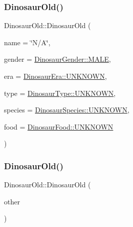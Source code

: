 \subsubsection{\texorpdfstring{Dinosaur\+Old()}{DinosaurOld()}\hspace{0.1cm}{\footnotesize\ttfamily [1/2]}}
{\footnotesize\ttfamily Dinosaur\+Old\+::\+Dinosaur\+Old (\begin{DoxyParamCaption}\item[{const char $\ast$}]{name = {\ttfamily \char`\"{}N/A\char`\"{}},  }\item[{const \hyperlink{DinosaurOld_8hpp_a98f70ab69c44631b0efc003a2c9b3d30}{Dinosaur\+Gender}}]{gender = {\ttfamily \hyperlink{DinosaurOld_8hpp_a98f70ab69c44631b0efc003a2c9b3d30a797e877326f44c5763d1458d7f56d87a}{Dinosaur\+Gender\+::\+M\+A\+LE}},  }\item[{const \hyperlink{DinosaurOld_8hpp_aa47f0b0878c65fb93dcaf8fde26dfaa5}{Dinosaur\+Era}}]{era = {\ttfamily \hyperlink{DinosaurOld_8hpp_aa47f0b0878c65fb93dcaf8fde26dfaa5a696b031073e74bf2cb98e5ef201d4aa3}{Dinosaur\+Era\+::\+U\+N\+K\+N\+O\+WN}},  }\item[{const \hyperlink{DinosaurOld_8hpp_a9f8d7b1c3f7b7d03f4101875fa35e8ea}{Dinosaur\+Type}}]{type = {\ttfamily \hyperlink{DinosaurOld_8hpp_a9f8d7b1c3f7b7d03f4101875fa35e8eaa696b031073e74bf2cb98e5ef201d4aa3}{Dinosaur\+Type\+::\+U\+N\+K\+N\+O\+WN}},  }\item[{const \hyperlink{DinosaurOld_8hpp_aef2140b5b57464fa283af86adcd6c5c1}{Dinosaur\+Species}}]{species = {\ttfamily \hyperlink{DinosaurOld_8hpp_aef2140b5b57464fa283af86adcd6c5c1a696b031073e74bf2cb98e5ef201d4aa3}{Dinosaur\+Species\+::\+U\+N\+K\+N\+O\+WN}},  }\item[{const \hyperlink{DinosaurOld_8hpp_aeeb0837497c35a4ebbceb4e9386909f8}{Dinosaur\+Food}}]{food = {\ttfamily \hyperlink{DinosaurOld_8hpp_aeeb0837497c35a4ebbceb4e9386909f8a696b031073e74bf2cb98e5ef201d4aa3}{Dinosaur\+Food\+::\+U\+N\+K\+N\+O\+WN}} }\end{DoxyParamCaption})}

\mbox{\label{classDinosaurOld_a2e685c70322e89771d6127985293bdf4}} 
\subsubsection{\texorpdfstring{Dinosaur\+Old()}{DinosaurOld()}\hspace{0.1cm}{\footnotesize\ttfamily [2/2]}}
{\footnotesize\ttfamily Dinosaur\+Old\+::\+Dinosaur\+Old (\begin{DoxyParamCaption}\item[{const \hyperlink{classDinosaurOld}{Dinosaur\+Old} \&}]{other }\end{DoxyParamCaption})}

